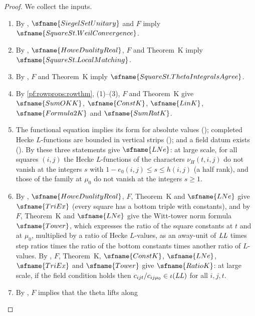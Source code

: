 \begin{proof}
We collect the inputs.
\begin{enumerate}[label=(\arabic*)]
\item By , $\sfname{SiegelSetUnitary}$ and $F$
imply $\sfname{SquareSt.WeilConvergence}$.
\item By , $\sfname{HoweDualityReal}$, $F$ and Theorem~K
imply $\sfname{SquareSt.LocalMatching}$.
\item By , $F$ and Theorem~K imply
$\sfname{SquareSt.ThetaIntegralsAgree}$.
\item By \cref{pf:rowprops:rowthm}, (1)--(3), $F$ and Theorem~K give $\sfname{SumOKK}$, $\sfname{ConstK}$, $\sfname{LinK}$,
$\sfname{Formula2K}$ and $\sfname{SumRatK}$.
\item The functional equation implies its form for absolute values
(); completed Hecke $L$-functions are bounded in
vertical strips (); and a field datum exists
(). By  these three
statements give $\sfname{LNe}$: at large scale, for all squares $(i,j)$ the Hecke $L$-functions of the characters
$\nu_H(t,i,j)$ do not vanish at the integers $s$ with $1-e_0(i,j)\le s\le h(i,j)$ (a half rank), and those of the
family at $\mu_0$ do not vanish at the integers $s\ge1$.
\item By , $\sfname{HoweDualityReal}$, $F$, Theorem~K and $\sfname{LNe}$
give $\sfname{TriEx}$ (every square has a bottom triple with constants), and by 
$F$, Theorem~K and $\sfname{LNe}$ give the Witt-tower norm formula $\sfname{Tower}$, which expresses the ratio of the square
constants at $t$ and at $\mu_0$, multiplied by a ratio of Hecke $L$-values, as an away-unit of $\mathit{LL}$ times step
ratios times the ratio of the bottom constants times another ratio of $L$-values. By
, $F$, Theorem~K, $\sfname{ConstK}$, $\sfname{LNe}$,
$\sfname{TriEx}$ and $\sfname{Tower}$ give $\sfname{RatioK}$: at large scale, if the field condition holds then
$c_{ijt}/c_{ij\mu_0}\in\iota(\mathit{LL})$ for all $i,j,t$.
\item By , $F$ implies that the theta lifts along

\end{enumerate}
\end{proof}
